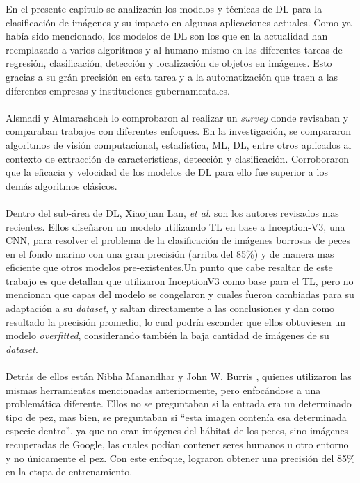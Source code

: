 En el presente capítulo se analizarán los modelos y técnicas de DL para la clasificación de imágenes y su impacto en algunas aplicaciones actuales. Como ya había sido mencionado, los modelos de DL son los que en la actualidad han reemplazado a varios algoritmos y al humano mismo en las diferentes tareas de regresión, clasificación, detección y localización de objetos en imágenes. Esto gracias a su grán precisión en esta tarea y a la automatización que traen a las diferentes empresas y instituciones gubernamentales. \\\\
Alsmadi y Almarashdeh \cite{Alsmadi2022} lo comprobaron al realizar un \textit{survey} donde revisaban y comparaban trabajos con diferentes enfoques. En la investigación, se compararon algoritmos de visión computacional, estadística, ML, DL, entre otros aplicados al contexto de extracción de características, detección y clasificación. Corroboraron que la eficacia y velocidad de los modelos de DL para ello fue superior a los demás algoritmos clásicos.\\\\
Dentro del sub-área de DL, Xiaojuan Lan, \textit{et al}.\cite{10.1145/3419635.3419643} son los autores revisados mas recientes. Ellos diseñaron un modelo utilizando TL en base a Inception-V3, una  CNN, para resolver el problema de la clasificación de imágenes borrosas de peces en el fondo marino con una gran precisión (arriba del 85\%) y de manera mas eficiente que otros modelos pre-existentes.Un punto que cabe resaltar de este trabajo es que detallan que utilizaron InceptionV3 como base para el TL, pero no mencionan que capas del modelo se congelaron y cuales fueron cambiadas para su adaptación a su \textit{dataset}, y saltan directamente a las conclusiones y dan como resultado la precisión promedio, lo cual podría esconder que ellos obtuviesen un modelo \textit{overfitted}, considerando también la baja cantidad de imágenes de su \textit{dataset}. \\\\
Detrás de ellos están Nibha Manandhar y John W. Burris \cite{10.1145/3325917.3325934}, quienes utilizaron las mismas herramientas mencionadas anteriormente, pero enfocándose a una problemática diferente. Ellos no se preguntaban si la entrada era un determinado tipo de pez, mas bien, se preguntaban si ``esta imagen contenía esa determinada especie dentro'', ya que no eran imágenes del hábitat de los peces, sino imágenes recuperadas de Google, las cuales podían contener seres humanos u otro entorno y no únicamente el pez. Con este enfoque, lograron obtener una precisión del 85\% en la etapa de entrenamiento. \\\\


